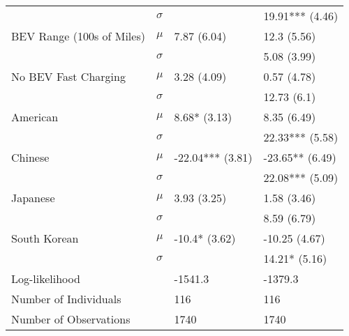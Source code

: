 \begin{tabular}{llll}
                          &  $\sigma$ &                               &               19.91*** (4.46) \\
BEV Range (100s of Miles) &     $\mu$ &                   7.87 (6.04) &                   12.3 (5.56) \\
                          &  $\sigma$ &                               &                   5.08 (3.99) \\
     No BEV Fast Charging &     $\mu$ &                   3.28 (4.09) &                   0.57 (4.78) \\
                          &  $\sigma$ &                               &                   12.73 (6.1) \\
                 American &     $\mu$ &                  8.68* (3.13) &                   8.35 (6.49) \\
                          &  $\sigma$ &                               &               22.33*** (5.58) \\
                  Chinese &     $\mu$ &              -22.04*** (3.81) &               -23.65** (6.49) \\
                          &  $\sigma$ &                               &               22.08*** (5.09) \\
                 Japanese &     $\mu$ &                   3.93 (3.25) &                   1.58 (3.46) \\
                          &  $\sigma$ &                               &                   8.59 (6.79) \\
             South Korean &     $\mu$ &                 -10.4* (3.62) &                 -10.25 (4.67) \\
                          &  $\sigma$ &                               &                 14.21* (5.16) \\
    \hline Log-likelihood &           &                       -1541.3 &                       -1379.3 \\
    Number of Individuals &           &                           116 &                           116 \\
   Number of Observations &           &                          1740 &                          1740 \\
\bottomrule
\end{tabular}
